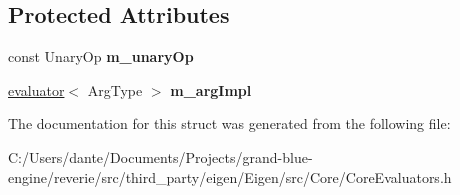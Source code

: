 \subsection*{Protected Attributes}
\begin{DoxyCompactItemize}
\item 
\mbox{\label{struct_eigen_1_1internal_1_1unary__evaluator_3_01_cwise_unary_view_3_01_unary_op_00_01_arg_type_01_4_00_01_index_based_01_4_ae7a0c2b380debf6923912a1127c2dde8}} 
const Unary\+Op {\bfseries m\+\_\+unary\+Op}
\item 
\mbox{\label{struct_eigen_1_1internal_1_1unary__evaluator_3_01_cwise_unary_view_3_01_unary_op_00_01_arg_type_01_4_00_01_index_based_01_4_a2e1a9306e8ad80d759a97dbe235878bc}} 
\mbox{\hyperlink{struct_eigen_1_1internal_1_1evaluator}{evaluator}}$<$ Arg\+Type $>$ {\bfseries m\+\_\+arg\+Impl}
\end{DoxyCompactItemize}


The documentation for this struct was generated from the following file\+:\begin{DoxyCompactItemize}
\item 
C\+:/\+Users/dante/\+Documents/\+Projects/grand-\/blue-\/engine/reverie/src/third\+\_\+party/eigen/\+Eigen/src/\+Core/Core\+Evaluators.\+h\end{DoxyCompactItemize}

